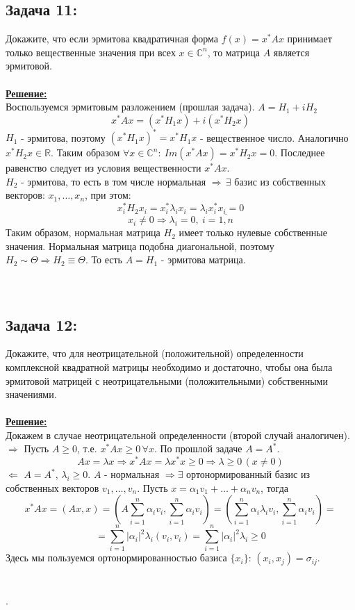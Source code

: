 \documentclass[a4paper,12pt,titlepage,final]{article}
\begin{document}
\subsection*{Задача 11:}
\noindent Докажите, что если эрмитова квадратичная форма $f(x) = x^*Ax$ принимает только вещественные значения при всех $x \in \mathbb{C}^n$, то матрица $A$ является эрмитовой.\\ \\
\textbf{\underline{Решение:}} \\
Воспользуемся эрмитовым разложением (прошлая задача). $A = H_1 + iH_2$
$$x^*Ax = (x^*H_1x) + i(x^*H_2x)$$
$H_1$ - эрмитова, поэтому $(x^*H_1x)^* = x^*H_1x$ - вещественное число. Аналогично $x^*H_2x \in \mathbb{R}$. Таким образом $\forall x \in \mathbb{C}^n: \: Im(x^*Ax) = x^*H_2x = 0$. Последнее равенство следует из условия вещественности $x^*Ax$. \\
$H_2$ - эрмитова, то есть в том числе нормальная $\Rightarrow \, \exists$ базис из собственных векторов: $x_1, \ldots, x_n$, при этом:
$$x_i^*H_2x_i = x_i^*\lambda_i x_i = \lambda_i x_i^*x_i = 0$$
$$x_i \neq 0 \Rightarrow \lambda_i = 0, \: i = \overline{1,n}$$
Таким образом, нормальная матрица $H_2$ имеет только нулевые собственные значения. Нормальная матрица подобна диагональной, поэтому $H_2 \sim \Theta \Rightarrow H_2 \equiv \Theta$. То есть $A = H_1$ - эрмитова матрица. \blacksquare \\ \\ \\

\subsection*{Задача 12:}
\noindent Докажите, что для неотрицательной (положительной) определенности комплексной квадратной матрицы необходимо и достаточно, чтобы она была эрмитовой матрицей с неотрицательными (положительными) собственными значениями.\\ \\
\textbf{\underline{Решение:}} \\
Докажем в случае неотрицательной определенности (второй случай аналогичен). \\
$\boldsymbol{\Rightarrow}$ Пусть $A \geq 0$, т.е. $x^*Ax \geq 0 \, \forall x$. По прошлой задаче $A = A^*$.
$$Ax = \lambda x \Rightarrow x^*Ax = \lambda x^*x \geq 0 \Rightarrow \lambda \geq 0 \,(x \neq 0)$$
$\boldsymbol{\Leftarrow}$ $A = A^*$, $\lambda_i \geq 0$. $A$ - нормальная $\Rightarrow \exists$ ортонормированный базис из собственных векторов $v_1, \ldots, v_n$.
Пусть $x = \alpha_1v_1 + \ldots + \alpha_nv_n$, тогда
$$x^*Ax = (Ax, x) = (A\sum_{i=1}^n\alpha_iv_i, \sum_{i=1}^n\alpha_iv_i) = (\sum_{i=1}^n\alpha_i\lambda_iv_i, \sum_{i=1}^n\alpha_iv_i) = $$
$$ = \sum_{i=1}^n|\alpha_i|^2\lambda_i(v_i, v_i) = \sum_{i=1}^n|\alpha_i|^2\lambda_i \geq 0$$
Здесь мы пользуемся ортонормированностью базиса $\{x_i\}$: $(x_i, x_j) = \sigma_{ij}$. \blacksquare \\ \\ \\.
\end{document}
